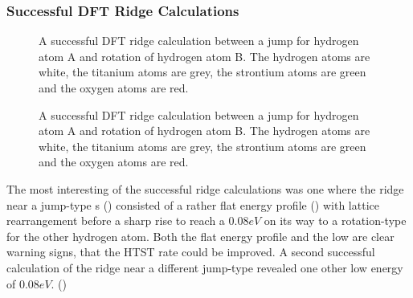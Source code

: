 \subsubsection{Successful DFT Ridge Calculations}
\begin{figure}[h]
\begin{center}
    \parbox{0.85\linewidth}{
      \caption{A successful DFT ridge calculation between a jump  for hydrogen atom A and rotation of hydrogen atom B.
The hydrogen atoms are white, the titanium atoms are grey, the strontium atoms are green and the oxygen atoms are red.
      }
      \label{fig:semi-results}
    }
\end{center}
\end{figure}
\begin{figure}[h]
\begin{center}
    \parbox{0.85\linewidth}{
      \caption{A successful DFT ridge calculation between a jump  for hydrogen atom A and rotation of hydrogen atom B.
The hydrogen atoms are white, the titanium atoms are grey, the strontium atoms are green and the oxygen atoms are red.
      }
      \label{fig:jump-results}
    }
\end{center}
\end{figure}
The most interesting of the successful ridge calculations was one where the ridge near a jump-type s () consisted of a rather flat energy profile () with lattice rearrangement before a sharp rise to reach a $0.08\unit{eV}$  on its way to a rotation-type  for the other hydrogen atom.
Both the flat energy profile and the low  are clear warning signs, that the HTST rate could be improved.
A second successful calculation of the ridge near a different jump-type  revealed one other low energy  of $0.08\unit{eV}$. ()

